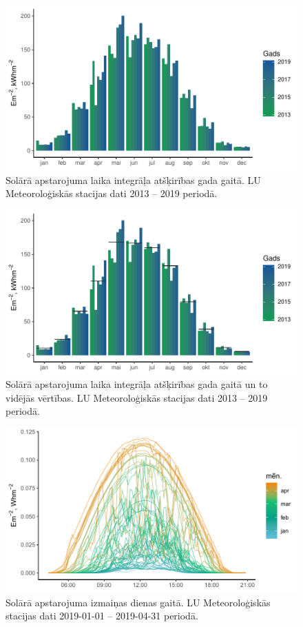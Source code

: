 \begin{figure}[h]
    \centering
    \includegraphics[width=\linewidth]{figures/meteo/statsYears.pdf}
    \caption{Solārā apstarojuma laika integrāļa atšķirības gada gaitā. LU Meteoroloģiskās stacijas dati 2013 -- 2019 periodā.}
    \label{fig:metYears}
\end{figure}
\begin{figure}[h]
    \centering
    \includegraphics[width=\linewidth]{figures/meteo/meanYears.pdf}
    \caption{Solārā apstarojuma laika integrāļa atšķirības gada gaitā un to vidējās vērtības. LU Meteoroloģiskās stacijas dati 2013 -- 2019 periodā.}
    \label{fig:metYears_mean}
\end{figure}
\begin{figure}[h]
    \centering
    \includegraphics[width=\linewidth]{figures/meteo/sun19.pdf}
    \caption{Solārā apstarojuma izmaiņas dienas gaitā. LU Meteoroloģiskās stacijas dati 2019-01-01 -- 2019-04-31 periodā.}
    \label{fig:met_Irrad}
\end{figure}
